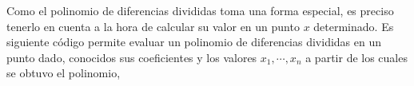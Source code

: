 


    
\begin{paracol}{2}
Como el polinomio de diferencias divididas toma una forma especial, es preciso tenerlo en cuenta a la hora de calcular su valor en un punto $x$ determinado. Es siguiente código permite evaluar un polinomio de diferencias divididas en un punto dado, conocidos sus coeficientes y los valores $x_1,\cdots, x_n$ a partir de los cuales se obtuvo el polinomio,
\end{paracol}




